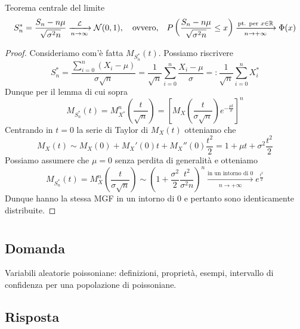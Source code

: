 \documentclass{article}
\begin{document}
\begin{enumerate}
\begin{theorem}{Teorema centrale del limite}{}
        \[S_n^* = \frac{S_n-n\mu}{\sqrt{\sigma^2 n}}\xrightarrow[n\to \infty]{\mathcal{L}}\mathcal{N}(0,1), \quad\text{ovvero,}\quad P\left(\frac{S_n - n\mu}{\sqrt{\sigma^2 n}}\le x\right) \xrightarrow[n\to +\infty]{\text{pt. per }x\in\mathbb{R}} \Phi(x)\]
    \end{theorem}
    \begin{proof}
        Consideriamo com'è fatta $M_{S_n^*}(t)$. Possiamo riscrivere
        \[S_n^* = \frac{\sum_{i=0}^n (X_i - \mu)}{\sigma \sqrt{n}} = \frac{1}{\sqrt{n}}\sum_{i=0}^n \frac{X_i - \mu}{\sigma} =: \frac{1}{\sqrt{n}}\sum_{i=0}^n X_i^*\]
        Dunque per il lemma di cui sopra
        \[M_{S_n^*}(t) = M_{X^*}^n\left(\frac{t}{\sqrt{n}}\right) = \left[M_X\left(\frac{t}{\sigma\sqrt{n}}\right)e^{-\frac{\mu t}{\sigma}}\right]^n\]
        Centrando in $t=0$ la serie di Taylor di $M_X(t)$ otteniamo che
        \[M_X(t)\sim M_X(0) + M_X'(0)t + M_X''(0)\frac{t^2}{2} = 1 + \mu t + \sigma^2 \frac{t^2}{2}\]
        Possiamo assumere che $\mu = 0$ senza perdita di generalità e otteniamo
        \[M_{S_n^*}(t) = M_X^n\left(\frac{t}{\sigma\sqrt{n}}\right) \sim \left(1 + \frac{\sigma^2}{2}\frac{t^2}{\sigma^2 n}\right)^n\xrightarrow[n\to +\infty]{\text{in un intorno di }0} e^\frac{t^2}{2}\]
        Dunque hanno la stessa MGF in un intorno di $0$ e pertanto sono identicamente distribuite.
    \end{proof}
\end{enumerate}

\section{}%

\subsection*{Domanda}

Variabili aleatorie poissoniane: definizioni, proprietà, esempi, intervallo di confidenza per una popolazione di poissoniane.

\subsection*{Risposta}
\end{document}
